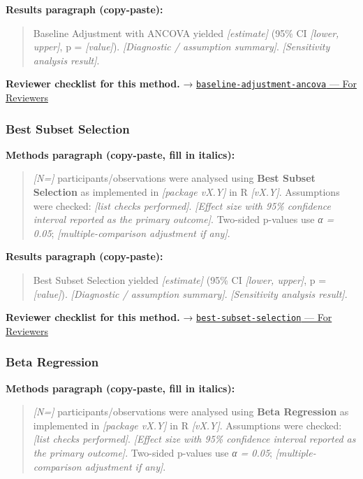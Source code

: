 \documentclass[
]{article}
\begin{document}
\textbf{Results paragraph (copy-paste):}

\begin{quote}
Baseline Adjustment with ANCOVA yielded \emph{{[}estimate{]}} (95\% CI
\emph{{[}lower, upper{]}}, p = \emph{{[}value{]}}). \emph{{[}Diagnostic
/ assumption summary{]}}. \emph{{[}Sensitivity analysis result{]}}.
\end{quote}

\textbf{Reviewer checklist for this method.} →
\href{../chapters/14-clinical/baseline-adjustment-ancova.Rmd\#for-reviewers}{\texttt{baseline-adjustment-ancova}
--- For Reviewers}

\subsubsection{Best Subset Selection}\label{best-subset-selection}

\textbf{Methods paragraph (copy-paste, fill in italics):}

\begin{quote}
\emph{{[}N={]}} participants/observations were analysed using
\textbf{Best Subset Selection} as implemented in \emph{{[}package
vX.Y{]}} in R \emph{{[}vX.Y{]}}. Assumptions were checked: \emph{{[}list
checks performed{]}}. \emph{{[}Effect size with 95\% confidence interval
reported as the primary outcome{]}}. Two-sided p-values use \emph{α =
0.05}; \emph{{[}multiple-comparison adjustment if any{]}}.
\end{quote}

\textbf{Results paragraph (copy-paste):}

\begin{quote}
Best Subset Selection yielded \emph{{[}estimate{]}} (95\% CI
\emph{{[}lower, upper{]}}, p = \emph{{[}value{]}}). \emph{{[}Diagnostic
/ assumption summary{]}}. \emph{{[}Sensitivity analysis result{]}}.
\end{quote}

\textbf{Reviewer checklist for this method.} →
\href{../chapters/07-regression/best-subset-selection.Rmd\#for-reviewers}{\texttt{best-subset-selection}
--- For Reviewers}

\subsubsection{Beta Regression}\label{beta-regression}

\textbf{Methods paragraph (copy-paste, fill in italics):}

\begin{quote}
\emph{{[}N={]}} participants/observations were analysed using
\textbf{Beta Regression} as implemented in \emph{{[}package vX.Y{]}} in
R \emph{{[}vX.Y{]}}. Assumptions were checked: \emph{{[}list checks
performed{]}}. \emph{{[}Effect size with 95\% confidence interval
reported as the primary outcome{]}}. Two-sided p-values use \emph{α =
0.05}; \emph{{[}multiple-comparison adjustment if any{]}}.
\end{quote}
\end{document}
